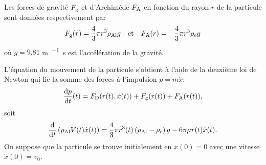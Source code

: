 Les forces de gravité $F_{\mathrm g}$ et d'Archimède $F_{\mathrm A}$
en fonction du rayon $r$ de la particule sont données respectivement
par
\begin{equation*}
F_{\mathrm g}(r) = \frac{4}{3}\pi r^3 \rho_\mathrm{Al} g
\quad\text{et}\quad
F_{\mathrm A}(r) = -\frac{4}{3}\pi r^3 \rho_\mathrm{e} g
\end{equation*}
où $g = 9.81$ \si{\meter\per\squared\second} est l'accélération de la gravité.

L'équation du mouvement de la particule s'obtient à l'aide de la
deuxième loi de Newton qui lie la somme des forces à l'impulsion $p =
m\dot x$:
\begin{equation*}
\frac{\mathrm dp}{\mathrm dt}(t) = F_{\mathrm D}(r(t), \dot x(t)) + F_{\mathrm g}(r(t)) + F_{\mathrm A}(r(t)),
\end{equation*}
soit
\begin{equation}\label{eq:mvt}
  \frac{\mathrm d}{\mathrm dt}\left( \rho_\mathrm{Al} V(t)\dot x(t) \right) =
  \frac{4}{3}\pi r^3(t)\left( \rho_\mathrm{Al} - \rho_\mathrm{e} \right)g -
  6\pi\mu r(t)\dot x(t).
\end{equation}
On suppose que la particule se trouve initialement en $x(0) = 0$ avec
une vitesse $\dot x(0) = v_0$.

